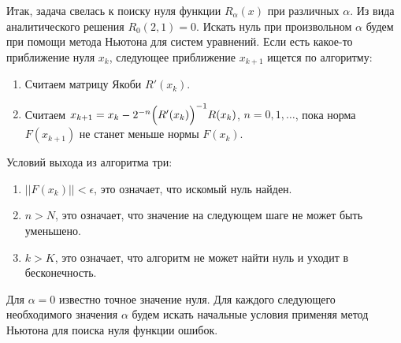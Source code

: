 \documentclass{article}
\begin{document}
Итак, задача свелась к поиску нуля функции $R_{\alpha}(x)$ при различных
$\alpha$. Из вида аналитического решения $R_{0}(2,1) = 0$.
Искать нуль при произвольном $\alpha$ будем при помощи метода
Ньютона для систем уравнений. Если есть какое-то приближение нуля $x_{k}$,
следующее приближение $x_{k+1}$ ищется по алгоритму:
\begin{enumerate}
  \item Считаем матрицу Якоби $R'(x_{k})$.
  \item Считаем $x_{k+1} = x_{k} - 2^{-n}\Bigl(R'(x_{k})\Bigr)^{-1}R(x_{k})$,
        $n = 0,1,\ldots$, пока норма $F(x_{k+1})$ не станет меньше нормы $F(x_{k})$.
\end{enumerate}
Условий выхода из алгоритма три:
\begin{enumerate}
  \item $||F(x_{k})|| < \epsilon$, это означает, что искомый нуль найден.
  \item $n > N$, это означает, что значение на следующем шаге не может быть уменьшено.
  \item $k > K$, это означает, что алгоритм не может найти нуль и уходит в бесконечность.
\end{enumerate}

Для $\alpha = 0$ известно точное значение нуля. Для каждого следующего необходимого значения $\alpha$ будем
искать начальные условия применяя метод Ньютона для поиска нуля функции ошибок.
\end{document}

